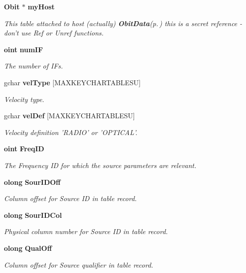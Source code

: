 \begin{CompactItemize}
{\bf Obit} $\ast$ {\bf my\-Host}
\begin{CompactList}\small\item\em This table attached to host (actually) {\bf Obit\-Data}{\rm (p.\,\pageref{structObitData})} this is a secret reference - don't use Ref or Unref functions. \item\end{CompactList}\item 
{\bf oint} {\bf num\-IF}
\begin{CompactList}\small\item\em The number of IFs. \item\end{CompactList}\item 
gchar {\bf vel\-Type} [MAXKEYCHARTABLESU]
\begin{CompactList}\small\item\em Velocity type. \item\end{CompactList}\item 
gchar {\bf vel\-Def} [MAXKEYCHARTABLESU]
\begin{CompactList}\small\item\em Velocity definition 'RADIO' or 'OPTICAL'. \item\end{CompactList}\item 
{\bf oint} {\bf Freq\-ID}
\begin{CompactList}\small\item\em The Frequency ID for which the source parameters are relevant. \item\end{CompactList}\item 
{\bf olong} {\bf Sour\-IDOff}
\begin{CompactList}\small\item\em Column offset for Source ID in table record. \item\end{CompactList}\item 
{\bf olong} {\bf Sour\-IDCol}
\begin{CompactList}\small\item\em Physical column number for Source ID in table record. \item\end{CompactList}\item 
{\bf olong} {\bf Qual\-Off}
\begin{CompactList}\small\item\em Column offset for Source qualifier in table record. \item\end{CompactList}\item 

\end{CompactItemize}

